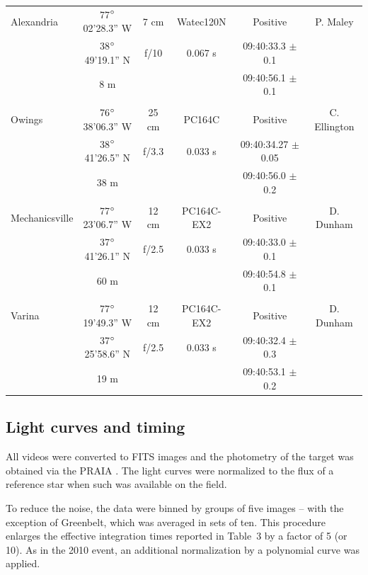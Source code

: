 \documentclass[useAMS,usenatbib]{mn2e}
\begin{document}
\begin{table}
\begin{minipage}{140mm}
\begin{tabular}{@{}lccccc}
 Alexandria & 77$\hbox{$^\circ$}$02'28.3'' W & 7 cm & Watec120N & Positive & P. Maley \\
  &38$\hbox{$^\circ$}$49'19.1'' N & f/10 &  0.067 s   & 09:40:33.3 $\pm$ 0.1 &   \\
            & 8 m       &   &     & 09:40:56.1  $\pm$ 0.1 &   \\
 & & & & & \\
 Owings & 76$\hbox{$^\circ$}$38'06.3'' W & 25 cm & PC164C  & Positive & C. Ellington \\
  &38$\hbox{$^\circ$}$41'26.5'' N & f/3.3 &  0.033 s & 09:40:34.27 $\pm$ 0.05 &   \\
            & 38 m                &       &     & 09:40:56.0  $\pm$ 0.2 &   \\
 & & & & & \\
 Mechanicsville & 77$\hbox{$^\circ$}$23'06.7'' W & 12 cm & PC164C-EX2 & Positive & D. Dunham \\
  &37$\hbox{$^\circ$}$41'26.1'' N & f/2.5 & 0.033 s    & 09:40:33.0 $\pm$ 0.1 &   \\
            & 60 m      &   &     & 09:40:54.8  $\pm$ 0.1 &   \\
 & & & & & \\
 Varina & 77$\hbox{$^\circ$}$19'49.3'' W & 12 cm & PC164C-EX2 & Positive & D. Dunham \\
  &37$\hbox{$^\circ$}$25'58.6'' N & f/2.5 &  0.033 s   & 09:40:32.4 $\pm$ 0.3 &   \\
            & 19 m      &   &     & 09:40:53.1  $\pm$ 0.2 &   \\

\hline
\end{tabular}
\end{minipage}
\end{table}

\subsection{Light curves and timing}

All videos were converted to FITS images and the photometry of the target was obtained via the PRAIA \citep{2011gfun.conf...85A}. The light curves were normalized to the flux of a reference star when such was available on the field.

To reduce the noise, the data were binned by groups of five images -- with the exception of  Greenbelt, which was averaged in sets of ten. This procedure enlarges the effective integration times reported in Table~3 by a factor of 5 (or 10). As in the 2010 event, an additional normalization by a polynomial curve was applied.
\end{document}
